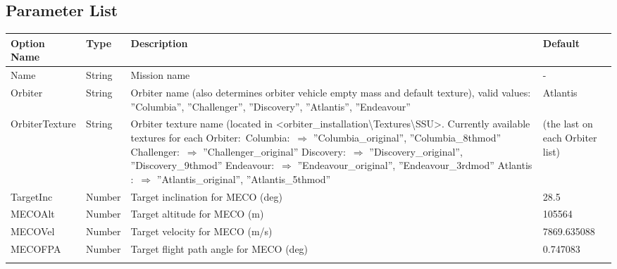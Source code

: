 \documentclass[Space_Shuttle_Ultra_Manual.tex]{subfiles}
\begin{document}
\newpage

\subsection{Parameter List}
  \begin{longtable}{|l|p{1.5cm}|p{7.5cm}|p{2.0cm}|}
	\hline
	\rule{0pt}{2ex}
	\textbf{Option Name} & \textbf{Type} & \textbf{Description} & \textbf{Default}\\
	\hline
	\rule{0pt}{2ex}
	Name & String & Mission name & -\\
	\hline
	\rule{0pt}{2ex}
	Orbiter & String & Orbiter name (also determines orbiter vehicle empty mass and default texture), valid values$\colon$ ''Columbia'', ''Challenger'', ''Discovery'', ''Atlantis'', ''Endeavour'' & Atlantis\\
	\hline
	\rule{0pt}{2ex}
	OrbiterTexture & String & Orbiter texture name (located in <orbiter\_installation\textbackslash Textures\textbackslash SSU>. Currently available textures for each Orbiter$\colon$ \newline
Columbia$\colon$ \newline
$\Rightarrow$ ''Columbia\_original'', ''Columbia\_8thmod''\newline
Challenger$\colon$\newline
$\Rightarrow$ ''Challenger\_original''\newline
Discovery$\colon$\newline
$\Rightarrow$ ''Discovery\_original'', ''Discovery\_9thmod''\newline
Endeavour$\colon$\newline
$\Rightarrow$ ''Endeavour\_original'', ''Endeavour\_3rdmod''\newline
Atlantis$\colon$\newline
$\Rightarrow$ ''Atlantis\_original'', ''Atlantis\_5thmod''	& (the last on each Orbiter list)\\
	\hline
	\rule{0pt}{2ex}
	TargetInc & Number & Target inclination for MECO (deg) & 28.5\\
	\hline
	\rule{0pt}{2ex}
	MECOAlt & Number & Target altitude for MECO (m) & 105564\\
	\hline
	\rule{0pt}{2ex}
	MECOVel & Number & Target velocity for MECO (m/s) & 7869.635088\\
	\hline
	\rule{0pt}{2ex}
	MECOFPA & Number & Target flight path angle for MECO (deg) & 0.747083\\
	\hline
	\rule{0pt}{2ex}

\end{longtable}
\end{document}
